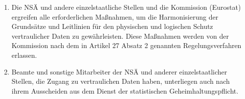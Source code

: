 \begin{enumerate}
            \item Die NSÄ und andere einzelstaatliche Stellen und die Kommission (Eurostat) ergreifen alle erforderlichen Maßnahmen, um die Harmonisierung der Grundsätze und Leitlinien für den physischen und logischen Schutz vertraulicher Daten zu gewährleisten. Diese Maßnahmen werden von der Kommission nach dem in Artikel 27 Absatz 2 genannten Regelungsverfahren erlassen.
            \item Beamte und sonstige Mitarbeiter der NSÄ und anderer einzelstaatlicher Stellen, die Zugang zu vertraulichen Daten haben, unterliegen auch nach ihrem Ausscheiden aus dem Dienst der statistischen Geheimhaltungspflicht.
        \end{enumerate}